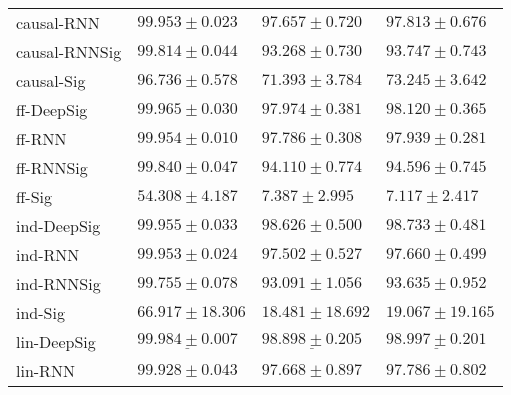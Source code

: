 \begin{tabular}{llll}
causal-RNN     &                           $ 99.953 \pm 0.023 $ &                           $ 97.657 \pm 0.720 $ &                           $ 97.813 \pm 0.676 $ \\
causal-RNNSig  &                           $ 99.814 \pm 0.044 $ &                           $ 93.268 \pm 0.730 $ &                           $ 93.747 \pm 0.743 $ \\
causal-Sig     &                           $ 96.736 \pm 0.578 $ &                           $ 71.393 \pm 3.784 $ &                           $ 73.245 \pm 3.642 $ \\
\midrule
ff-DeepSig     &                           $ 99.965 \pm 0.030 $ &                           $ 97.974 \pm 0.381 $ &                           $ 98.120 \pm 0.365 $ \\
ff-RNN         &                           $ 99.954 \pm 0.010 $ &                           $ 97.786 \pm 0.308 $ &                           $ 97.939 \pm 0.281 $ \\
ff-RNNSig      &                           $ 99.840 \pm 0.047 $ &                           $ 94.110 \pm 0.774 $ &                           $ 94.596 \pm 0.745 $ \\
ff-Sig         &                           $ 54.308 \pm 4.187 $ &                            $ 7.387 \pm 2.995 $ &                            $ 7.117 \pm 2.417 $ \\
\midrule
ind-DeepSig    &                           $ 99.955 \pm 0.033 $ &               $  \mathbf{ 98.626 \pm 0.500 } $ &               $  \mathbf{ 98.733 \pm 0.481 } $ \\
ind-RNN        &                           $ 99.953 \pm 0.024 $ &                           $ 97.502 \pm 0.527 $ &                           $ 97.660 \pm 0.499 $ \\
ind-RNNSig     &                           $ 99.755 \pm 0.078 $ &                           $ 93.091 \pm 1.056 $ &                           $ 93.635 \pm 0.952 $ \\
ind-Sig        &                          $ 66.917 \pm 18.306 $ &                          $ 18.481 \pm 18.692 $ &                          $ 19.067 \pm 19.165 $ \\
\midrule
lin-DeepSig    &  $  \mathbf{ \underline{ 99.984 \pm 0.007 }} $ &  $  \mathbf{ \underline{ 98.898 \pm 0.205 }} $ &  $  \mathbf{ \underline{ 98.997 \pm 0.201 }} $ \\
lin-RNN        &                           $ 99.928 \pm 0.043 $ &                           $ 97.668 \pm 0.897 $ &                           $ 97.786 \pm 0.802 $ \\

\end{tabular}
